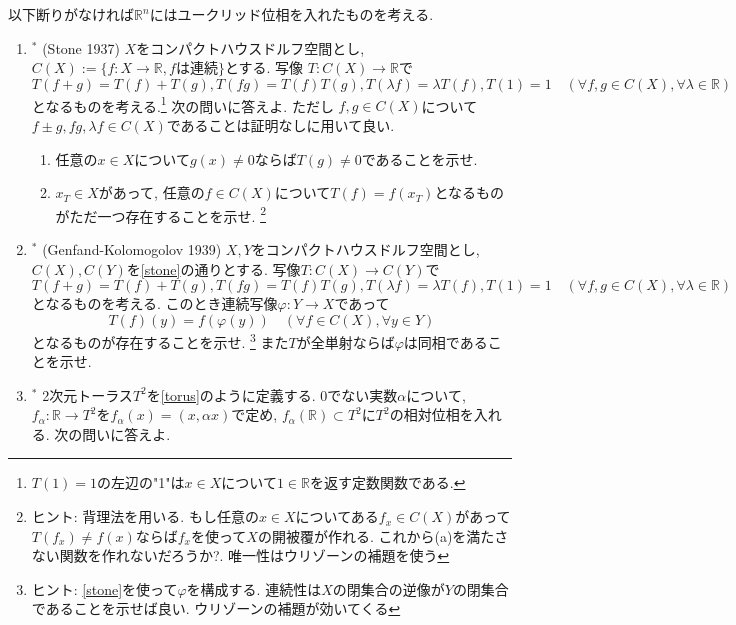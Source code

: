 \documentclass[dvipdfmx,a4paper,11pt]{article}
\newcommand{\R}{\mathbb{R}}
\theoremstyle{definition}
\begin{document}
以下断りがなければ$\R^{n}$にはユークリッド位相を入れたものを考える. 
\begin{enumerate}[label=\textbf{問}\ref*{sec-compact_continue}.\arabic*]
	\setlength{\parskip}{0cm} 
  \setlength{\itemsep}{7pt} 
\item \label{stone} $^{*}$ (Stone 1937) $X$をコンパクトハウスドルフ空間とし, $C(X):= \{ f : X \rightarrow \R, \text{$f$は連続}\}$とする. 写像
$T : C(X) \rightarrow \R$で
$$
T(f + g) = T(f) + T(g), T(fg)=T(f)T(g),  T(\lambda f) = \lambda T(f), T(1)=1 \quad (\forall f,g \in C(X), \forall \lambda \in \R)
$$
となるものを考える.\footnote{$T(1) = 1$の左辺の"1"は$x \in X$について$1 \in \R$を返す定数関数である. } 次の問いに答えよ.
ただし $f,g \in C(X)$について$f \pm g, fg, \lambda f \in C(X)$であることは証明なしに用いて良い. 
\begin{enumerate}
 \setlength{\parskip}{0cm}
  \setlength{\itemsep}{0pt} 
\item 任意の$x \in X$について$g(x) \neq 0$ならば$T(g) \neq 0$であることを示せ. 
\item $x_{T} \in X$があって, 任意の$f \in C(X)$について$T(f) = f(x_{T})$となるものがただ一つ存在することを示せ. \footnote{ヒント: 背理法を用いる. もし任意の$x \in X$についてある$f_{x} \in C(X)$があって$T(f_x) \neq f(x)$ならば$f_x$を使って$X$の開被覆が作れる. これから(a)を満たさない関数を作れないだろうか?. 唯一性はウリゾーンの補題を使う}
\end{enumerate}

\item $^{*}$\label{Gelfand} (Genfand-Kolomogolov 1939) $X,Y$をコンパクトハウスドルフ空間とし, $C(X), C(Y)$を\ref{stone}の通りとする.
写像$T : C(X) \rightarrow C(Y)$で
$$
T(f + g) = T(f) + T(g), T(fg)=T(f)T(g), T(\lambda f) = \lambda T(f), T(1) =1 \quad (\forall f,g \in C(X), \forall \lambda \in \R)
$$
となるものを考える.%
このとき連続写像$\varphi : Y \rightarrow X$であって
$$
T(f)(y) = f(\varphi(y)) \quad  (\forall f\in C(X), \forall y \in Y)
$$
となるものが存在することを示せ. \footnote{ヒント: \ref{stone}を使って$\varphi$を構成する. 連続性は$X$の閉集合の逆像が$Y$の閉集合であることを示せば良い. ウリゾーンの補題が効いてくる}
また$T$が全単射ならば$\varphi$は同相であることを示せ.

 \item \label{foliation}$^{*}$ 2次元トーラス$T^2$を\ref{torus}のように定義する. 0でない実数$\alpha$について, $f_{\alpha}: \R \rightarrow T^2$を$f_{\alpha}(x) =  (x, \alpha x)$で定め, $f_{\alpha}(\R) \subset T^2$に$T^2$の相対位相を入れる. 次の問いに答えよ.


\end{enumerate}
\end{document}
